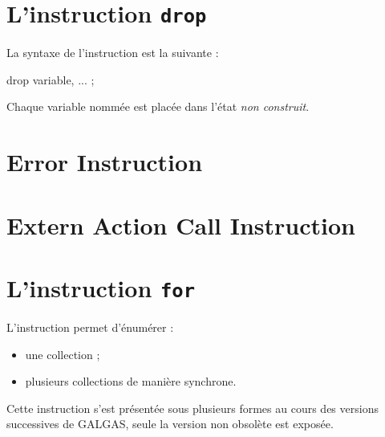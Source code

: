 





\section{L'instruction \texttt{drop}}

La syntaxe de l'instruction  est la suivante :
{
\begin{galgascode}
drop variable, ... ;
\end{galgascode}
}

Chaque variable nommée est placée dans l'état \emph{non construit}.

\section{Error Instruction}


\section{Extern Action Call Instruction}




\section{L'instruction \texttt{for}}
















L'instruction  permet d'énumérer :
\begin{itemize}
  \item une collection ;
  \item plusieurs collections de manière synchrone.
\end{itemize}

Cette instruction s'est présentée sous plusieurs formes au cours des versions successives de GALGAS, seule la version non obsolète est exposée.

